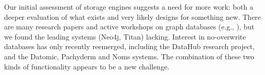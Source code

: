 \documentclass{sig-alternate}
\begin{document}


Our initial assessment of storage engines suggests a need for more work: both a deeper evaluation of what exists and very likely designs for something new. There are many research papers and active workshops on graph databases (e.g., \cite{grades16}), but we found the leading systems (Neo4j, Titan) lacking. 
Interest in no-overwrite databases has only recently reemerged, including the DataHub research project, and the Datomic, Pachyderm and Noms systems.  The combination of these two kinds of functionality 
appears to be a new challenge.


\end{document}
